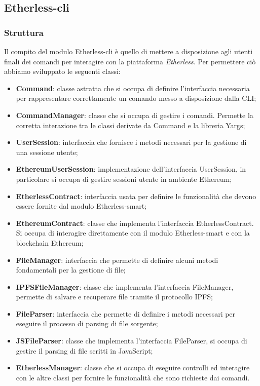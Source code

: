 \subsection{Etherless-cli}
\subsubsection{Struttura}
Il compito del modulo Etherless-cli è quello di mettere a disposizione agli utenti finali dei comandi per interagire con la piattaforma \textit{Etherless}. Per permettere ciò abbiamo sviluppato le seguenti classi:
\begin{itemize}
	\item \textbf{Command}: classe astratta che si occupa di definire l'interfaccia necessaria per rappresentare correttamente un comando messo a disposizione dalla CLI;
	\item \textbf{CommandManager}: classe che si occupa di gestire i comandi. Permette la corretta interazione tra le classi derivate da Command e la libreria Yargs;
	\item \textbf{UserSession}: interfaccia che fornisce i metodi necessari per la gestione di una sessione utente;
	\item \textbf{EthereumUserSession}: implementazione dell'interfaccia UserSession, in particolare si occupa di gestire sessioni utente in ambiente Ethereum;
	\item \textbf{EtherlessContract}: interfaccia usata per definire le funzionalità che devono essere fornite dal modulo Etherless-smart;
	\item \textbf{EthereumContract}: classe che implementa l'interfaccia EtherlessContract. Si occupa di interagire direttamente con il modulo Etherless-smart e con la blockchain Ethereum;
	\item \textbf{FileManager}: interfaccia che permette di definire alcuni metodi fondamentali per la gestione di file;
	\item \textbf{IPFSFileManager}: classe che implementa l'interfaccia FileManager, permette di salvare e recuperare file tramite il protocollo IPFS;
	\item \textbf{FileParser}: interfaccia che permette di definire i metodi necessari per eseguire il processo di parsing di file sorgente;
	\item \textbf{JSFileParser}: classe che implementa l'interfaccia FileParser, si occupa di gestire il parsing di file scritti in JavaScript;
	\item \textbf{EtherlessManager}: classe che si occupa di eseguire controlli ed interagire con le altre classi per fornire le funzionalità che sono richieste dai comandi.
\end{itemize}


